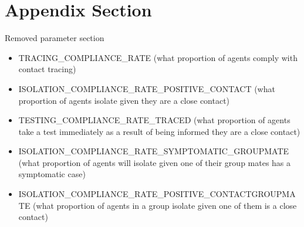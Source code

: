 \documentclass{article}
\begin{document}
\newpage
\appendix

\section{Appendix Section}

Removed parameter section
\begin{itemize}
\item TRACING\_COMPLIANCE\_RATE (what proportion of agents comply with contact tracing)
\item ISOLATION\_COMPLIANCE\_RATE\_POSITIVE\_CONTACT (what proportion of agents isolate given they are a close contact) 

\item TESTING\_COMPLIANCE\_RATE\_TRACED (what proportion of agents take a test immediately as a result of being informed they are a close contact)


\item ISOLATION\_COMPLIANCE\_RATE\_SYMPTOMATIC\_GROUPMATE (what proportion of agents will isolate given one of their group mates has a symptomatic case)

\item ISOLATION\_COMPLIANCE\_RATE\_POSITIVE\_CONTACTGROUPMATE (what proportion of agents in a group isolate given one of them is a close contact)
\end{itemize}
\end{document}
